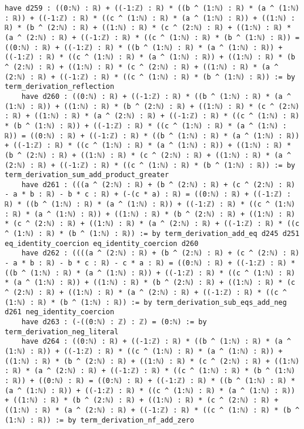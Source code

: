\documentclass{article}
\begin{document}
\begin{tcolorbox}[colback=white!10, width=\linewidth]
\begin{lstlisting}[language=Lean4]
    have d259 : ((0:ℕ) : ℝ) + ((-1:ℤ) : ℝ) * ((b ^ (1:ℕ) : ℝ) * (a ^ (1:ℕ) : ℝ)) + ((-1:ℤ) : ℝ) * ((c ^ (1:ℕ) : ℝ) * (a ^ (1:ℕ) : ℝ)) + ((1:ℕ) : ℝ) * (b ^ (2:ℕ) : ℝ) + ((1:ℕ) : ℝ) * (c ^ (2:ℕ) : ℝ) + ((1:ℕ) : ℝ) * (a ^ (2:ℕ) : ℝ) + ((-1:ℤ) : ℝ) * ((c ^ (1:ℕ) : ℝ) * (b ^ (1:ℕ) : ℝ)) = ((0:ℕ) : ℝ) + ((-1:ℤ) : ℝ) * ((b ^ (1:ℕ) : ℝ) * (a ^ (1:ℕ) : ℝ)) + ((-1:ℤ) : ℝ) * ((c ^ (1:ℕ) : ℝ) * (a ^ (1:ℕ) : ℝ)) + ((1:ℕ) : ℝ) * (b ^ (2:ℕ) : ℝ) + ((1:ℕ) : ℝ) * (c ^ (2:ℕ) : ℝ) + ((1:ℕ) : ℝ) * (a ^ (2:ℕ) : ℝ) + ((-1:ℤ) : ℝ) * ((c ^ (1:ℕ) : ℝ) * (b ^ (1:ℕ) : ℝ)) := by term_derivation_reflection
    have d260 : ((0:ℕ) : ℝ) + ((-1:ℤ) : ℝ) * ((b ^ (1:ℕ) : ℝ) * (a ^ (1:ℕ) : ℝ)) + ((1:ℕ) : ℝ) * (b ^ (2:ℕ) : ℝ) + ((1:ℕ) : ℝ) * (c ^ (2:ℕ) : ℝ) + ((1:ℕ) : ℝ) * (a ^ (2:ℕ) : ℝ) + ((-1:ℤ) : ℝ) * ((c ^ (1:ℕ) : ℝ) * (b ^ (1:ℕ) : ℝ)) + ((-1:ℤ) : ℝ) * ((c ^ (1:ℕ) : ℝ) * (a ^ (1:ℕ) : ℝ)) = ((0:ℕ) : ℝ) + ((-1:ℤ) : ℝ) * ((b ^ (1:ℕ) : ℝ) * (a ^ (1:ℕ) : ℝ)) + ((-1:ℤ) : ℝ) * ((c ^ (1:ℕ) : ℝ) * (a ^ (1:ℕ) : ℝ)) + ((1:ℕ) : ℝ) * (b ^ (2:ℕ) : ℝ) + ((1:ℕ) : ℝ) * (c ^ (2:ℕ) : ℝ) + ((1:ℕ) : ℝ) * (a ^ (2:ℕ) : ℝ) + ((-1:ℤ) : ℝ) * ((c ^ (1:ℕ) : ℝ) * (b ^ (1:ℕ) : ℝ)) := by term_derivation_sum_add_product_greater
    have d261 : (((a ^ (2:ℕ) : ℝ) + (b ^ (2:ℕ) : ℝ) + (c ^ (2:ℕ) : ℝ) - a * b : ℝ) - b * c : ℝ) + (-(c * a) : ℝ) = ((0:ℕ) : ℝ) + ((-1:ℤ) : ℝ) * ((b ^ (1:ℕ) : ℝ) * (a ^ (1:ℕ) : ℝ)) + ((-1:ℤ) : ℝ) * ((c ^ (1:ℕ) : ℝ) * (a ^ (1:ℕ) : ℝ)) + ((1:ℕ) : ℝ) * (b ^ (2:ℕ) : ℝ) + ((1:ℕ) : ℝ) * (c ^ (2:ℕ) : ℝ) + ((1:ℕ) : ℝ) * (a ^ (2:ℕ) : ℝ) + ((-1:ℤ) : ℝ) * ((c ^ (1:ℕ) : ℝ) * (b ^ (1:ℕ) : ℝ)) := by term_derivation_add_eq d245 d251 eq_identity_coercion eq_identity_coercion d260
    have d262 : ((((a ^ (2:ℕ) : ℝ) + (b ^ (2:ℕ) : ℝ) + (c ^ (2:ℕ) : ℝ) - a * b : ℝ) - b * c : ℝ) - c * a : ℝ) = ((0:ℕ) : ℝ) + ((-1:ℤ) : ℝ) * ((b ^ (1:ℕ) : ℝ) * (a ^ (1:ℕ) : ℝ)) + ((-1:ℤ) : ℝ) * ((c ^ (1:ℕ) : ℝ) * (a ^ (1:ℕ) : ℝ)) + ((1:ℕ) : ℝ) * (b ^ (2:ℕ) : ℝ) + ((1:ℕ) : ℝ) * (c ^ (2:ℕ) : ℝ) + ((1:ℕ) : ℝ) * (a ^ (2:ℕ) : ℝ) + ((-1:ℤ) : ℝ) * ((c ^ (1:ℕ) : ℝ) * (b ^ (1:ℕ) : ℝ)) := by term_derivation_sub_eqs_add_neg d261 neg_identity_coercion
    have d263 : (-((0:ℕ) : ℤ) : ℤ) = (0:ℕ) := by term_derivation_neg_literal
    have d264 : ((0:ℕ) : ℝ) + ((-1:ℤ) : ℝ) * ((b ^ (1:ℕ) : ℝ) * (a ^ (1:ℕ) : ℝ)) + ((-1:ℤ) : ℝ) * ((c ^ (1:ℕ) : ℝ) * (a ^ (1:ℕ) : ℝ)) + ((1:ℕ) : ℝ) * (b ^ (2:ℕ) : ℝ) + ((1:ℕ) : ℝ) * (c ^ (2:ℕ) : ℝ) + ((1:ℕ) : ℝ) * (a ^ (2:ℕ) : ℝ) + ((-1:ℤ) : ℝ) * ((c ^ (1:ℕ) : ℝ) * (b ^ (1:ℕ) : ℝ)) + ((0:ℕ) : ℝ) = ((0:ℕ) : ℝ) + ((-1:ℤ) : ℝ) * ((b ^ (1:ℕ) : ℝ) * (a ^ (1:ℕ) : ℝ)) + ((-1:ℤ) : ℝ) * ((c ^ (1:ℕ) : ℝ) * (a ^ (1:ℕ) : ℝ)) + ((1:ℕ) : ℝ) * (b ^ (2:ℕ) : ℝ) + ((1:ℕ) : ℝ) * (c ^ (2:ℕ) : ℝ) + ((1:ℕ) : ℝ) * (a ^ (2:ℕ) : ℝ) + ((-1:ℤ) : ℝ) * ((c ^ (1:ℕ) : ℝ) * (b ^ (1:ℕ) : ℝ)) := by term_derivation_nf_add_zero

\end{lstlisting}
\end{tcolorbox}
\end{document}
